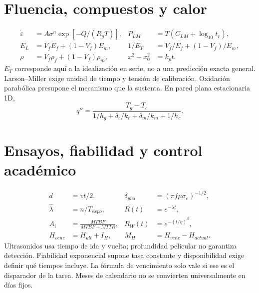 \section{Fluencia, compuestos y calor}
\begin{align*}
\dot\varepsilon&=A\sigma^n\exp[-Q/(R_gT)],&P_{LM}&=T(C_{LM}+\log_{10}t_r),\\
E_L&=V_fE_f+(1-V_f)E_m,&1/E_T&=V_f/E_f+(1-V_f)/E_m,\\
\rho&=V_f\rho_f+(1-V_f)\rho_m,&x^2-x_0^2&=k_pt.
\end{align*}
$E_T$ corresponde aquí a la idealización en serie, no a una predicción exacta general. Larson--Miller exige unidad de tiempo y tensión de calibración. Oxidación parabólica presupone el mecanismo que la sustenta. En pared plana estacionaria 1D,
\[q''=\frac{T_g-T_c}{1/h_g+\delta_r/k_r+\delta_m/k_m+1/h_c}.\]
\section{Ensayos, fiabilidad y control académico}
\begin{align*}
d&=vt/2,&\delta_{piel}&=(\pi f\mu\sigma_e)^{-1/2},\\
\widehat\lambda&=n/T_{expo},&R(t)&=e^{-\lambda t},\\
A_i&=\frac{MTBF}{MTBF+MTTR},&R_W(t)&=e^{-(t/\eta)^\beta},\\
H_{venc}&=H_{ult}+I_H,&M_H&=H_{venc}-H_{actual}.
\end{align*}
Ultrasonidos usa tiempo de ida y vuelta; profundidad pelicular no garantiza detección. Fiabilidad exponencial supone tasa constante y disponibilidad exige definir qué tiempos incluye. La fórmula de vencimiento solo vale si ese es el disparador de la tarea. Meses de calendario no se convierten universalmente en días fijos.
